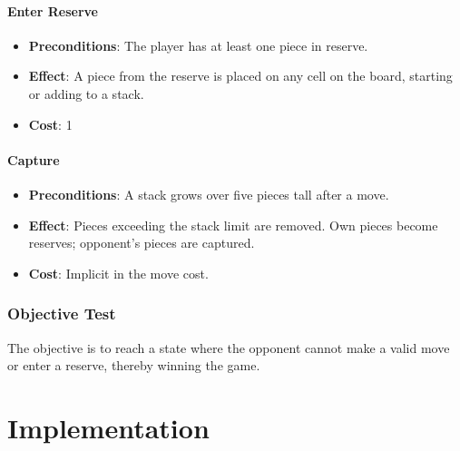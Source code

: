 \documentclass[a4paper, 11pt]{article}
\begin{document}
\paragraph{Enter Reserve}
\begin{itemize}
    \item \textbf{Preconditions}: The player has at least one piece in reserve.
    \item \textbf{Effect}: A piece from the reserve is placed on any cell on the board, starting or adding to a stack.
    \item \textbf{Cost}: 1
\end{itemize}

\paragraph{Capture}
\begin{itemize}
    \item \textbf{Preconditions}: A stack grows over five pieces tall after a move.
    \item \textbf{Effect}: Pieces exceeding the stack limit are removed. Own pieces become reserves; opponent's pieces are captured.
    \item \textbf{Cost}: Implicit in the move cost.
\end{itemize}

\subsubsection{Objective Test}
The objective is to reach a state where the opponent cannot make a valid move or enter a reserve, thereby winning the game.



\section{Implementation}
\end{document}
